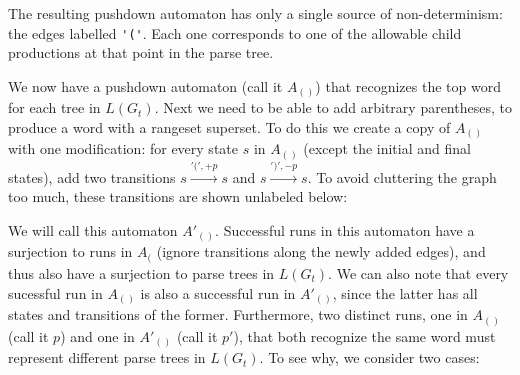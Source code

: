 \documentclass[acmsmall,review,anonymous]{acmart}\settopmatter{printfolios=true,printccs=false,printacmref=false}
\begin{document}
\noindent The resulting pushdown automaton has only a single source of non-determinism: the edges labelled \verb|'('|. Each one corresponds to one of the allowable child productions at that point in the parse tree.

We now have a pushdown automaton (call it $A_{()}$) that recognizes the top word for each tree in $L(G_t)$. Next we need to be able to add arbitrary parentheses, to produce a word with a rangeset superset. To do this we create a copy of $A_{()}$ with one modification: for every state $s$ in $A_{()}$ (except the initial and final states), add two transitions $s \xrightarrow{'(', +p} s$ and $s \xrightarrow{')', -p} s$. To avoid cluttering the graph too much, these transitions are shown unlabeled below:

\begin{center}
\end{center}

\noindent We will call this automaton $A'_{()}$. Successful runs in this automaton have a surjection to runs in $A_($ (ignore transitions along the newly added edges), and thus also have a surjection to parse trees in $L(G_t)$. We can also note that every sucessful run in $A_{()}$ is also a successful run in $A'_{()}$, since the latter has all states and transitions of the former. Furthermore, two distinct runs, one in $A_{()}$ (call it $p$) and one in $A'_{()}$ (call it $p'$), that both recognize the same word must represent different parse trees in $L(G_t)$. To see why, we consider two cases:
\end{document}
